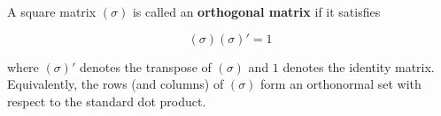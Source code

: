 A square matrix $(\sigma)$ is called an \textbf{orthogonal matrix} if it satisfies

$$(\sigma)(\sigma)' = 1$$

where $(\sigma)'$ denotes the transpose of $(\sigma)$ and $1$ denotes the identity matrix. Equivalently, the rows (and columns) of $(\sigma)$ form an orthonormal set with respect to the standard dot product.
